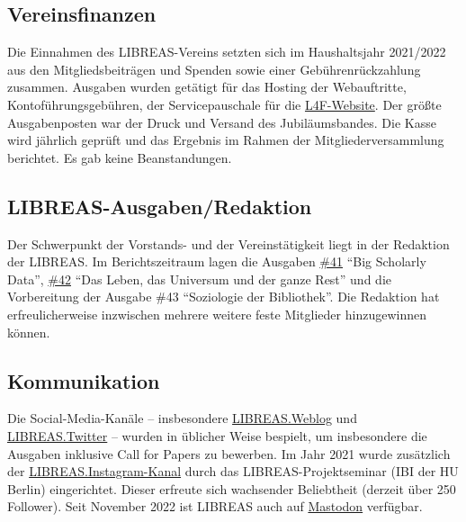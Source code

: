 \documentclass[a4paper,
fontsize=11pt,
oneside,
numbers=noperiodatend,
parskip=half-,
bibliography=totoc,
final
]{scrartcl}
\begin{document}
\hypertarget{vereinsfinanzen}{%
\subsection{Vereinsfinanzen}\label{vereinsfinanzen}}

Die Einnahmen des LIBREAS-Vereins setzten sich im Haushaltsjahr
2021/2022 aus den Mitgliedsbeiträgen und Spenden sowie einer
Gebührenrückzahlung zusammen. Ausgaben wurden getätigt für das Hosting
der Webauftritte, Kontoführungsgebühren, der Servicepauschale für die
\href{https://libraries4future.org/}{L4F-Website}. Der größte Ausgabenposten war der Druck und Versand des
Jubiläumsbandes. Die Kasse wird jährlich geprüft und das Ergebnis im
Rahmen der Mitgliederversammlung berichtet. Es gab keine Beanstandungen.

\hypertarget{libreas-ausgabenredaktion}{%
\subsection{LIBREAS-Ausgaben/Redaktion}\label{libreas-ausgabenredaktion}}

Der Schwerpunkt der Vorstands- und der Vereinstätigkeit liegt in der
Redaktion der LIBREAS. Im Berichtszeitraum lagen die Ausgaben
\href{https://libreas.eu/ausgabe41/inhalt/}{\#41} \enquote{Big Scholarly
Data}, \href{https://libreas.eu/ausgabe42/inhalt/}{\#42} \enquote{Das
Leben, das Universum und der ganze Rest} und die Vorbereitung der
Ausgabe \#43 \enquote{Soziologie der Bibliothek}. Die Redaktion hat
erfreulicherweise inzwischen mehrere weitere feste Mitglieder
hinzugewinnen können.

\hypertarget{kommunikation}{%
\subsection{Kommunikation}\label{kommunikation}}

Die Social-Media-Kanäle -- insbesondere
\href{https://libreas.wordpress.com/}{LIBREAS.Weblog} und
\href{https://twitter.com/libreas}{LIBREAS.Twitter} -- wurden in
üblicher Weise bespielt, um insbesondere die Ausgaben inklusive Call for
Papers zu bewerben. Im Jahr 2021 wurde zusätzlich der
\href{https://www.instagram.com/libreas.libraryideas/}{LIBREAS.Instagram-Kanal}
durch das LIBREAS-Projektseminar (IBI der HU Berlin) eingerichtet.
Dieser erfreute sich wachsender Beliebtheit (derzeit über 250 Follower).
Seit November 2022 ist LIBREAS auch auf
\href{https://berlin.social/@libreas@openbiblio.social}{Mastodon}
verfügbar.
\end{document}
